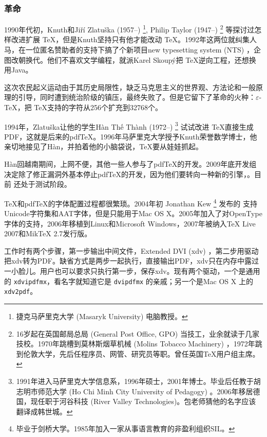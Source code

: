 \subsubsection{革命}

1990年代初，Knuth和Jiří Zlatuška (1957--)\indexZlatuska{} \footnote{捷克马萨里克大学 (Masaryk University)\indexMasaryk{} 电脑教授。}, Philip Taylor (1947--)\indexTaylor{} \footnote{16岁起在英国邮局总局 (General Post Office, GPO) 当技工，业余就读于几家技校。1970年跳槽到莫林斯烟草机械 (Molins Tobacco Machinery) ，1972年跳到伦敦大学\indexLondon，先后任程序员、网管、研究员等职。曾任英国TeX用户组主席。} 等探讨过怎样改进扩展 \TeX ，但是Knuth坚持只有他才能改动 \TeX。1992年这两位就纠集人马，在一位匿名赞助者的支持下搞了个新项目new typesetting system (NTS) ，企图改朝换代。他们不喜欢文学编程，就派Karel Skoupý把 \TeX 逆向工程，还想换用Java。

这次农民起义运动由于其历史局限性，缺乏马克思主义的世界观、方法论和一般原理的引导，同时遭到统治阶级的镇压，最终失败了。但是它留下了革命的火种：$\varepsilon$-\TeX ，把 \TeX 支持的字符从256个扩充到32768个。

1994年，Zlatuška让他的学生{\lmr Hàn Thế Thành} (1972--)\indexHan{} \footnote{1991年进入马萨里克大学信息系，1996年硕士，2001年博士。毕业后任教于胡志明市师范大学 (Ho Chi Minh City University of Pedagogy) 。2006年移居德国，现任职于河谷科技 (River Valley Technologies)\indexRiverValley。包老师猜他的名字应该翻译成韩世城。} 试试改进 \TeX 直接生成PDF，这就是后来的pdfTeX。1996年马萨里克大学授予Knuth荣誉数学博士，他亲切地接见了Hàn，并拍着他的小脑袋说，\TeX 要从娃娃抓起。

Hàn回越南期间，上网不便，其他一些人参与了pdfTeX的开发。2009年底开发组决定除了修正漏洞外基本停止pdfTeX的开发，因为他们要转向一种新的引擎，\LuaTeX。目前 \LuaTeX 还处于测试阶段。

\TeX 和pdfTeX的字体配置过程都很繁琐。2004年初 Jonathan Kew\indexKew{} \footnote{毕业于剑桥大学。1985年加入一家从事语言教育的非盈利组织SIL\indexSIL。} 发布的 \XeTeX 支持Unicode字符集和AAT字体，但是只能用于Mac OS X。2005年加入了对OpenType 字体的支持，2006年移植到Linux和Microsoft Windows，2007年被纳入TeX Live 2007和MikTeX 2.7发行版。

\XeTeX 工作时有两个步骤，第一步输出中间文件，Extended DVI (xdv) ，第二步用驱动把xdv转为PDF。缺省方式是两步一起执行，直接输出PDF，xdv只在内存中露过一小脸儿。用户也可以要求只执行第一步，保存xdv。\XeTeX 现有两个驱动，一个是通用的 \texttt{xdvipdfmx}，看名字就知道它是 \texttt{dvipdfmx} 的亲戚；另一个是Mac OS X 上的 \texttt{xdv2pdf}。

